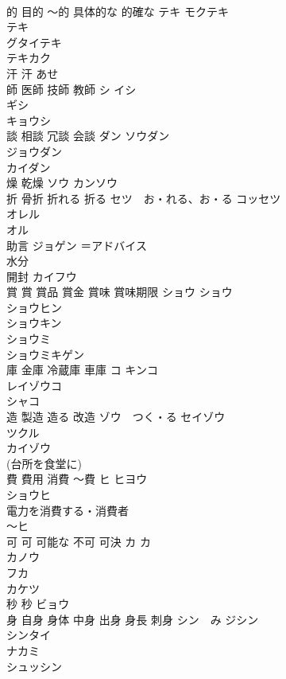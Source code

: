 \documentclass[8pt]{extreport}
\begin{document}
\begin{CJK}{UTF8}{min}
\\	的 目的 〜的 具体的な 的確な	テキ モクテキ 
\\	テキ 
\\	グタイテキ 
\\	テキカク 
\\	汗 汗	あせ 
\\	師 医師 技師 教師	シ イシ 
\\	ギシ 
\\	キョウシ 
\\	談 相談 冗談 会談	ダン ソウダン 
\\	ジョウダン 
\\	カイダン 
\\	燥 乾燥	ソウ カンソウ 
\\	折 骨折 折れる 折る	セツ　お・れる、お・る コッセツ 
\\	オレル 
\\	オル 
\\	助言	ジョゲン ＝アドバイス　
\\	水分	
\\	開封	カイフウ 
\\	賞 賞 賞品 賞金 賞味 賞味期限	ショウ ショウ 
\\	ショウヒン 
\\	ショウキン 
\\	ショウミ 
\\	ショウミキゲン 
\\	庫 金庫 冷蔵庫 車庫	コ キンコ 
\\	レイゾウコ 
\\	シャコ 
\\	造 製造 造る 改造	ゾウ　つく・る セイゾウ 
\\	ツクル 
\\	カイゾウ 
\\	(台所を食堂に)
\\	費 費用 消費 〜費	ヒ ヒヨウ 
\\	ショウヒ 
\\	電力を消費する・消費者 
\\	〜ヒ　
\\	可 可 可能な 不可 可決	カ カ 
\\	カノウ 
\\	フカ
\\	カケツ 
\\	秒 秒	ビョウ 
\\	身 自身 身体 中身 出身 身長 刺身	シン　み ジシン 
\\	シンタイ 
\\	ナカミ 
\\	シュッシン 

\end{CJK}
\end{document}
